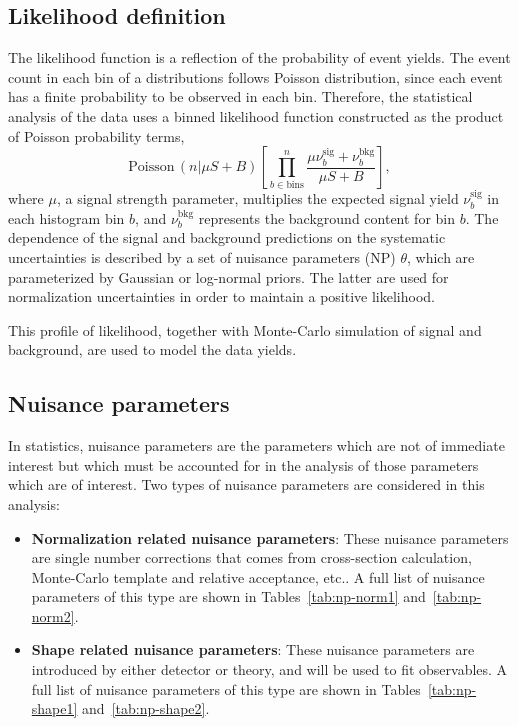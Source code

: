 \subsection{Likelihood definition}

\par The likelihood function is a reflection of the probability of event yields. 
The event count in each bin of a distributions follows Poisson distribution, since each event has a finite probability to be observed in each bin.
Therefore, the statistical analysis of the data uses a binned likelihood function constructed as the product of Poisson probability terms,
\begin{equation}
\mathrm{Poisson}\,(n|\mu S+B)\left[ \prod_{b\in \text{bins}}^{n} \frac{\mu \nu^{\mathrm{sig}}_{b}+\nu^{\mathrm{bkg}}_{b}}{\mu S+B} \right],
\end{equation}
where $\mu$, a signal strength parameter, multiplies the expected signal yield $\nu^{\mathrm{sig}}_b$ in each histogram bin $b$, and $\nu^{\mathrm{bkg}}_b$ represents the background content for bin $b$. 
The dependence of the signal and background predictions on the systematic uncertainties is described by a set of nuisance parameters (NP) $\theta$, which are parameterized by Gaussian or log-normal priors. 
The latter are used for normalization uncertainties in order to maintain a positive likelihood.

\par This profile of likelihood, together with Monte-Carlo simulation of signal and background, are used to model the data yields.

\subsection{Nuisance parameters}

\par In statistics, nuisance parameters are the parameters which are not of immediate interest but which must be accounted for in the analysis of those parameters which are of interest. 
Two types of nuisance parameters are considered in this analysis:
\begin{itemize}
    \item \textbf{Normalization related nuisance parameters}: These nuisance parameters are single number corrections that comes from cross-section calculation, Monte-Carlo template and relative acceptance, etc.. 
    A full list of nuisance parameters of this type are shown in Tables~\ref{tab:np-norm1} and~\ref{tab:np-norm2}.
    \item \textbf{Shape related nuisance parameters}: These nuisance parameters are introduced by either detector or theory, and will be used to fit observables. 
    A full list of nuisance parameters of this type are shown in Tables~\ref{tab:np-shape1} and~\ref{tab:np-shape2}.
\end{itemize}

